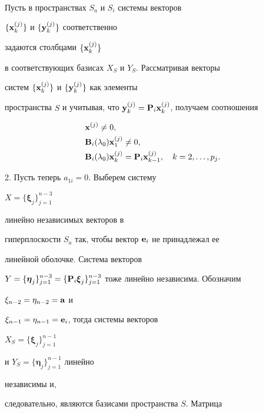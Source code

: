 \begin{pf}
\begin{align*}
\end{align*} 


Пусть в пространствах $S_a$ и $S_i$ системы векторов 


$\{\bold x^{(j)}_k\}$ и $\{\bold y^{(j)}_k\}$ соответственно 


задаются столбцами $\{\bold x^{(j)}_k\}$


в соответствующих базисах $X_S$ и $Y_S$. Рассматривая векторы 


систем $\{\bold x^{(j)}_k\}$ и $\{\bold y^{(j)}_k\}$ как элементы 


пространства $S$ и учитывая, что $\bold y^{(j)}_k=\bold P_i\bold 


x^{(j)}_k$, получаем соотношения 


\begin{align} 


& \bold x^{(j)}\ne0,\notag \\ 


& \bold B_i(\lambda_0)\bold x^{(j)}_1\ne0, \\ 


& \bold B_i(\lambda_0)\bold x^{(j)}_k= 


\bold P_i\bold x^{(j)}_{k-1},\quad k=2,\dotsc,p_j. \notag


\end{align} 


 


2. Пусть теперь $a_{1i}=0$. Выберем систему


$X=\{\boldsymbol \xi_j\}^{n-3}_{j=1}$ 


линейно независимых векторов в 


гиперплоскости $S_a$ так, чтобы вектор $\bold e_i$ не принадлежал ее 


линейной оболочке. Система векторов


$Y=\{\boldsymbol\eta_j\}^{n-3}_{j=1}=\{\bold P_i 


\boldsymbol\xi_j\}^{n-3}_{j=1}$ тоже линейно независима. Обозначим 


$\xi_{n-2}=\eta_{n-2}=\bold a$ и 


$\xi_{n-1}=\eta_{n-1}=\bold e_i$, тогда системы векторов 


$X_S=\{\boldsymbol\xi_j\}^{n-1}_{j=1}$


и $Y_S=\{\boldsymbol\eta_j\}^{n-1}_{j=1}$ линейно 


независимы и, 


следовательно, являются базисами пространства $S$. Матрица 



\end{pf}
